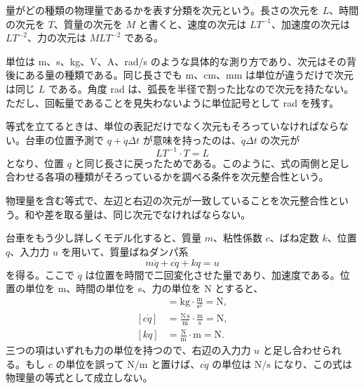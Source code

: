 \begin{definition}[次元]
量がどの種類の物理量であるかを表す分類を次元という。長さの次元を $L$、時間の次元を $T$、質量の次元を $M$ と書くと、速度の次元は $LT^{-1}$、加速度の次元は $LT^{-2}$、力の次元は $MLT^{-2}$ である。
\end{definition}

単位は m、s、kg、V、A、rad/s のような具体的な測り方であり、次元はその背後にある量の種類である。同じ長さでも m、cm、mm は単位が違うだけで次元は同じ $L$ である。角度 rad は、弧長を半径で割った比なので次元を持たない。ただし、回転量であることを見失わないように単位記号として rad を残す。

等式を立てるときは、単位の表記だけでなく次元もそろっていなければならない。台車の位置予測で $q+\dot{q}\Delta t$ が意味を持ったのは、$\dot{q}\Delta t$ の次元が
\begin{equation}
  LT^{-1}\cdot T=L
\end{equation}
となり、位置 $q$ と同じ長さに戻ったためである。このように、式の両側と足し合わせる各項の種類がそろっているかを調べる条件を次元整合性という。

\begin{definition}[次元整合性]
物理量を含む等式で、左辺と右辺の次元が一致していることを次元整合性という。和や差を取る量は、同じ次元でなければならない。
\end{definition}

台車をもう少し詳しくモデル化すると、質量 $m$、粘性係数 $c$、ばね定数 $k$、位置 $q$、入力力 $u$ を用いて、質量ばねダンパ系
\begin{equation}
  m\ddot{q}+c\dot{q}+kq=u
\end{equation}
を得る。ここで $\ddot{q}$ は位置を時間で二回変化させた量であり、加速度である。位置の単位を m、時間の単位を s、力の単位を N とすると、
\begin{align}
  [m\ddot{q}]&=\mathrm{kg}\cdot\frac{\mathrm{m}}{\mathrm{s}^2}
    =\mathrm{N},\\
  [c\dot{q}]&=\frac{\mathrm{N\,s}}{\mathrm{m}}\cdot
    \frac{\mathrm{m}}{\mathrm{s}}
    =\mathrm{N},\\
  [kq]&=\frac{\mathrm{N}}{\mathrm{m}}\cdot\mathrm{m}
    =\mathrm{N}.
\end{align}
三つの項はいずれも力の単位を持つので、右辺の入力力 $u$ と足し合わせられる。もし $c$ の単位を誤って $\mathrm{N/m}$ と置けば、$c\dot{q}$ の単位は $\mathrm{N/s}$ になり、この式は物理量の等式として成立しない。


